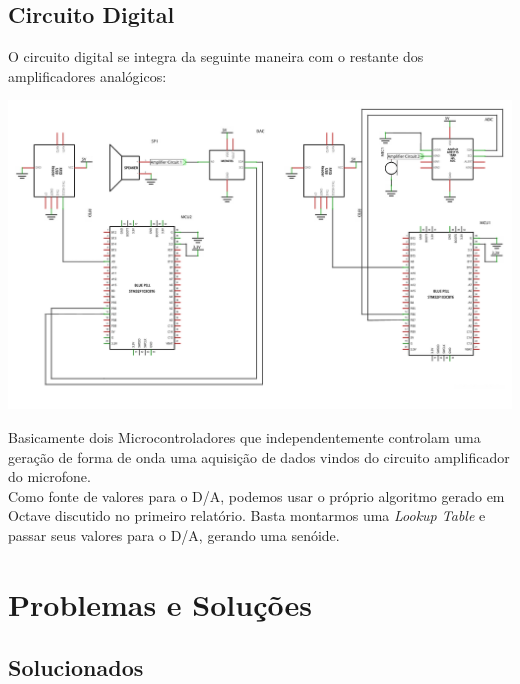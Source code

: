 \documentclass[12pt,a4paper]{report}
\begin{document}
	\section{Circuito Digital}
	O circuito digital se integra da seguinte maneira com o restante dos amplificadores analógicos:
	
	\includegraphics[angle=90,origin=c]{digitaln.pdf}
	
	Basicamente dois Microcontroladores que independentemente controlam uma geração de forma de onda uma aquisição de dados vindos do circuito amplificador do microfone.\\
	
	Como fonte de valores para o D/A, podemos usar o próprio algoritmo gerado em Octave discutido no primeiro relatório. Basta montarmos uma {\it Lookup Table} e passar seus valores para o D/A, gerando uma senóide. 
	
	
	\chapter{Problemas e Soluções}
	
	\section{Solucionados}
	
\end{document}
